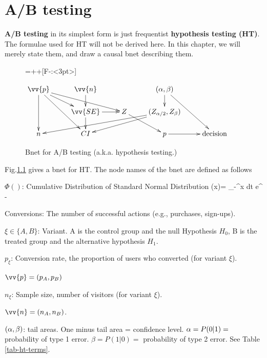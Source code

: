 \chapter{A/B testing}
\label{ch-a-b-testing}

{\bf A/B testing} in its simplest
form is just frequentist {\bf hypothesis testing (HT)}.
The formulae used for HT
will not be  derived here. 
In this chapter, we will merely state them,
and draw a causal bnet describing them.


\begin{figure}[h!]

{\entrymodifiers={++[F-:<3pt>]}

$$\xymatrix@R=15pt{
\vv{p}\ar[dd]
\ar[ddr]
\ar[dr]
\ar[drr]
&\vv{n}\ar[d]
&*{}
&(\alp, \beta)\ar[d]
\ar[ddr]
&*{}
&*{}
\\
*{}
&\vv{SE}\ar[d]\ar[r]
&Z\ar[dr]
&(Z_{\alp/2}, Z_\beta)\ar[dlll]
\ar[dll]
&*{}
&*{}
\\
n
&CI
&*{}
&p\ar[r]
&\text{decision}
}$$
}
\caption{Bnet for A/B testing (a.k.a. 
hypothesis testing.)}
\label{fig-bnet-hypo-test}
\end{figure}

Fig.\ref{fig-bnet-hypo-test}
gives a bnet for HT. The node names 
of the bnet are defined as follows

$\Phi()$: Cumulative Distribution
of Standard Normal Distribution
\beq
\Phi (x)=
\int_{-\infty}^x dt\; e^{
-}
\eeq

Conversions: The number of successful actions (e.g., purchases, sign-ups). 

$\xi\in\{A,B\}$: Variant. A is the control group
and the null Hypothesis $H_0$, B is 
the treated group
and the alternative hypothesis $H_1$.
 
$p_\xi$: Conversion rate, the proportion of users who converted (for variant $\xi$).

$\vv{p}=(p_A, p_B)$

$n_\xi$: Sample size, number of visitors
(for variant $\xi$).
   
$\vv{n}=(n_A, n_B)$.

$(\alpha, \beta)$: tail areas. One minus tail area = confidence level. $\alpha=P(0|1)=$ probability of type 1 error. $\beta=P(1|0)=$
probability of type 2 error. See Table
\ref{tab-ht-terms}.

